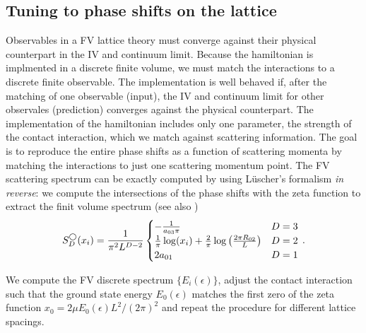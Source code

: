 \subsection{Tuning to phase shifts on the lattice}\label{sec:tuning}

Observables in a FV lattice theory must converge against their physical counterpart in the IV and continuum limit.
Because the hamiltonian is implmented in a discrete finite volume, we must match the interactions to a discrete finite observable.
The implementation is well behaved if, after the matching of one observable (input), the IV and continuum limit for other observales (prediction) converges against the physical counterpart.
The implementation of the hamiltonian includes only one parameter, the strength of the contact interaction, which we match against scattering information.
The goal is to reproduce the entire phase shifts as a function of scattering momenta by matching the interactions to just one scattering momentum point.
The FV scattering spectrum can be exactly computed by using L\"{u}scher's formalism \textit{in reverse}: we compute the intersections of the phase shifts with the zeta function to extract the finit volume spectrum (see also )
\begin{equation}
    S^\bigcirc_D(x_i)
    =
    \frac{1}{\pi^2 L^{D-2}}
    \begin{cases}
        -\frac{1}{a_{03} \pi}   & D=3\\
        \frac{1}{\pi}\log(x_i) + \frac{2}{\pi} \log \left(\frac{ 2 \pi R_{02}}{L}\right) & D=2\\
        2 a_{01}   & D=1
    \end{cases}
	\, .
\end{equation}

We compute the FV discrete spectrum $\{E_i(\epsilon)\}$, adjust the contact interaction such that the ground state energy $E_0(\epsilon)$ matches the first zero of the zeta function $x_0 = 2 \mu E_0(\epsilon) L^2 / (2 \pi)^2$  and repeat the procedure for different lattice spacings.
